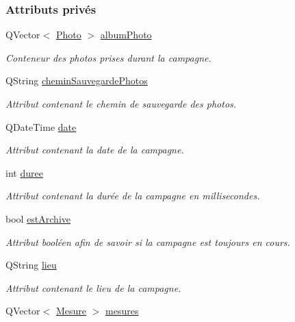 \subsubsection*{Attributs privés}
\begin{DoxyCompactItemize}
\item 
Q\+Vector$<$ \hyperlink{struct_photo}{Photo} $>$ \hyperlink{class_campagne_a4d1fc7d4dbf10868a297fe3df7f08dbf}{album\+Photo}
\begin{DoxyCompactList}\small\item\em Conteneur des photos prises durant la campagne. \end{DoxyCompactList}\item 
Q\+String \hyperlink{class_campagne_a95484d0782021bc30157669d16c42208}{chemin\+Sauvegarde\+Photos}
\begin{DoxyCompactList}\small\item\em Attribut contenant le chemin de sauvegarde des photos. \end{DoxyCompactList}\item 
Q\+Date\+Time \hyperlink{class_campagne_ac8180e3e533648770c4e6d9a182fe3ed}{date}
\begin{DoxyCompactList}\small\item\em Attribut contenant la date de la campagne. \end{DoxyCompactList}\item 
int \hyperlink{class_campagne_a4fb4cb286275103c9b6946e25e301fbf}{duree}
\begin{DoxyCompactList}\small\item\em Attribut contenant la durée de la campagne en millisecondes. \end{DoxyCompactList}\item 
bool \hyperlink{class_campagne_a6ff3284dd54897c32c2ab9478f1f50ec}{est\+Archive}
\begin{DoxyCompactList}\small\item\em Attribut booléen afin de savoir si la campagne est toujours en cours. \end{DoxyCompactList}\item 
Q\+String \hyperlink{class_campagne_a1df66832d5d700bfd2bd36fe548f7cba}{lieu}
\begin{DoxyCompactList}\small\item\em Attribut contenant le lieu de la campagne. \end{DoxyCompactList}\item 
Q\+Vector$<$ \hyperlink{struct_mesure}{Mesure} $>$ \hyperlink{class_campagne_ac460df42e2fbc12aae7b97abbe219ad0}{mesures}

\end{DoxyCompactItemize}
